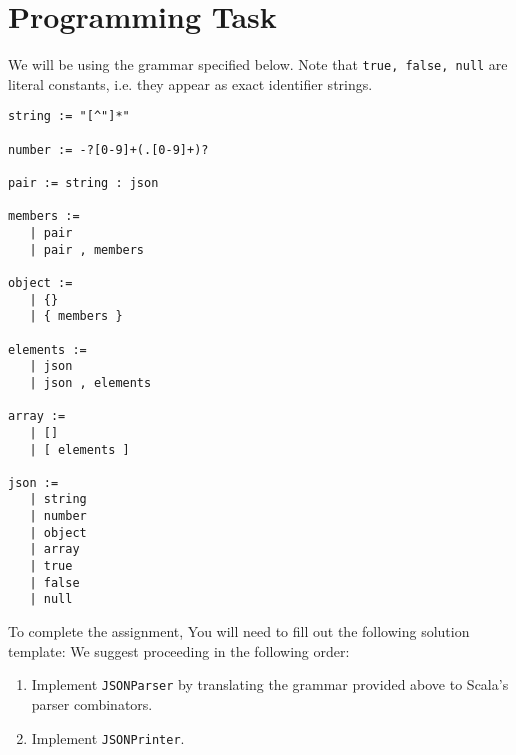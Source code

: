 \section{Programming Task}
We will be using the grammar specified below. Note that \texttt{true, false,
null} are literal constants, i.e. they appear as exact identifier strings.
\begin{verbatim}
string := "[^"]*"

number := -?[0-9]+(.[0-9]+)?

pair := string : json

members :=
   | pair
   | pair , members

object :=
   | {}
   | { members }

elements :=
   | json
   | json , elements

array :=
   | []
   | [ elements ]

json :=
   | string
   | number
   | object
   | array
   | true
   | false
   | null
\end{verbatim}
To complete the assignment, You will need to fill out the following solution
template:
We suggest proceeding in the following order:
\begin{enumerate}
    \item Implement \lstinline|JSONParser| by translating the grammar provided
    above to Scala's parser combinators.
    \item Implement \lstinline|JSONPrinter|.
\end{enumerate}
